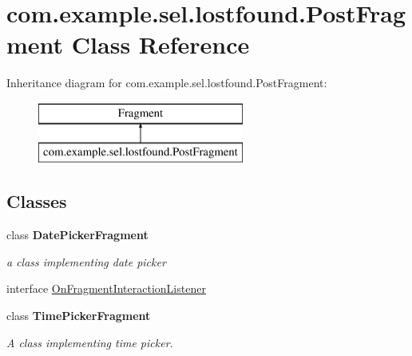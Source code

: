 \hypertarget{classcom_1_1example_1_1sel_1_1lostfound_1_1PostFragment}{}\section{com.\+example.\+sel.\+lostfound.\+Post\+Fragment Class Reference}
\label{classcom_1_1example_1_1sel_1_1lostfound_1_1PostFragment}
Inheritance diagram for com.\+example.\+sel.\+lostfound.\+Post\+Fragment\+:\begin{figure}[H]
\begin{center}
\leavevmode
\includegraphics[height=2.000000cm]{classcom_1_1example_1_1sel_1_1lostfound_1_1PostFragment}
\end{center}
\end{figure}
\subsection*{Classes}
\begin{DoxyCompactItemize}
\item 
class {\bfseries Date\+Picker\+Fragment}
\begin{DoxyCompactList}\small\item\em a class implementing date picker \end{DoxyCompactList}\item 
interface \hyperlink{interfacecom_1_1example_1_1sel_1_1lostfound_1_1PostFragment_1_1OnFragmentInteractionListener}{On\+Fragment\+Interaction\+Listener}
\item 
class {\bfseries Time\+Picker\+Fragment}
\begin{DoxyCompactList}\small\item\em A class implementing time picker. \end{DoxyCompactList}\end{DoxyCompactItemize}

